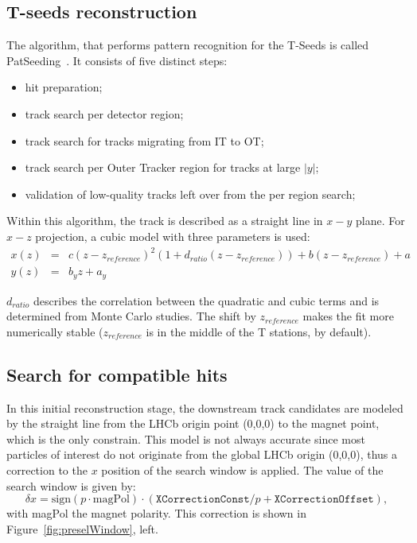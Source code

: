 \subsection{T-seeds reconstruction}
The algorithm, that performs pattern recognition for the T-Seeds is called PatSeeding~\cite{PatSeeding}. It consists of five distinct steps: 

\begin{itemize}
\item hit preparation;
\item track search per detector region;
\item track search for tracks migrating from IT to OT;
\item track search per Outer Tracker region for tracks at large $|y|$;
\item validation of low-quality tracks left over from the per region search;
\end{itemize}

Within this algorithm, the track is described as a straight line in $x-y$ plane. For $x-z$ projection, a cubic model with three parameters is used:
\begin{eqnarray}
x(z)&=&c(z-z_{reference})^2(1+d_{ratio}(z-z_{reference})) + b(z-z_{reference})+a \\
y(z)&=&b_{y}z+a_y
\end{eqnarray}

$d_{ratio}$ describes the correlation between the quadratic and cubic terms and is determined from
Monte Carlo studies. The shift by $z_{reference}$ makes the fit more numerically stable ($z_{reference}$ is
in the middle of the T stations, by default).

\subsection{Search for compatible hits}
In this initial reconstruction stage, the downstream track candidates are modeled by the straight line from the LHCb origin point (0,0,0) to the magnet point, which is the only constrain. 
This model is not always accurate since most particles of interest do not originate from the global LHCb origin (0,0,0), thus a correction to the $x$ position of the search window is applied.  The value of the search window is given by: 
\begin{equation}
\delta x = \text{sign}(p\cdot \text{magPol}) \cdot \left( \texttt{XCorrectionConst} / p + \texttt{XCorrectionOffset} \right),
\end{equation}
with magPol the magnet polarity. This correction is  shown in Figure~\ref{fig:preselWindow}, left. 
 
